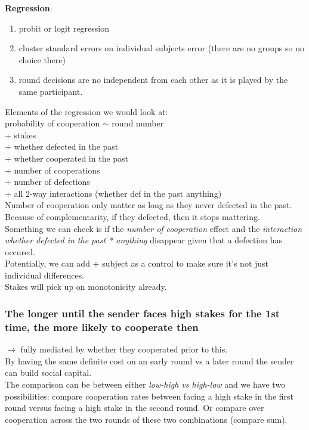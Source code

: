 \documentclass[11pt]{article}
\theoremstyle{plainCl1}
\begin{document}
\noindent
\textbf{Regression}:
\begin{enumerate}
    \item probit or logit regression
    \item cluster standard errors on individual subjects error (there are no groups so no choice there)
    \item round decisions are no independent from each other as it is played by the same participant.
\end{enumerate}
Elements of the regression we would look at: \\
probability of cooperation $\sim$ round number \\
\hspace*{20mm} + {\color{Green}stakes} \\
\hspace*{20mm} + {\color{Green}whether defected in the past} \\
\hspace*{20mm} + whether cooperated in the past \\
\hspace*{20mm} + {\color{Green}number of cooperations} \\
\hspace*{20mm} + number of defections \\
\hspace*{20mm} + all 2-way interactions ({\color{Green}whether def in the past \* anything})\\

\noindent
Number of cooperation only matter as long as they never defected in the past. Because of complementarity, if they defected, then it stops mattering. \\
Something we can check is if the \textsl{number of cooperation} effect and the \textsl{interaction whether defected in the past * anything} disappear given that a defection has occured. \\
Potentially, we can add + subject as a control to make sure it's not just individual differences. \\
Stakes will pick up on monotonicity already. \\

\subsubsection{The longer until the sender faces high stakes for the 1st time, the more likely to cooperate then} 

$\rightarrow$ fully mediated by whether they cooperated prior to this.\\
By having the same definite cost on an early round vs a later round the sender can build social capital. \\
The comparison can be between either \textsl{low-high vs high-low} and we have two possibilities: 
compare cooperation rates between facing a high stake in the first round versus facing a high stake in the second round. 
Or compare over cooperation across the two rounds of these two combinations (compare sum). \\
\end{document}
